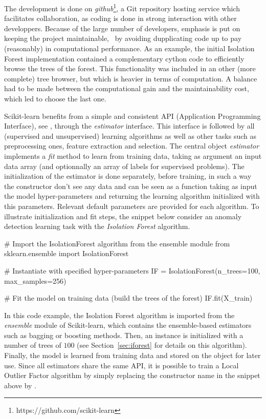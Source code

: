 The development is done on \emph{github}\footnote{https://github.com/scikit-learn}, a Git repository hosting service which facilitates collaboration, as coding is done in strong interaction with other developpers. Because of the large number of developers, emphasis is put on keeping the project maintainable, \eg~by avoiding dupplicating code up to pay (reasonably) in computational performance. As an example, the initial Isolation Forest implementation contained a complementary cython code to efficiently browse the trees of the forest. This functionality was included in an other (more complete) tree browser, but which is heavier in terms of computation. A balance had to be made between the computational gain and the maintainability cost, which led to choose the last one.


Scikit-learn benefits from a simple and consistent API (Application Programming Interface), see \cite{sklearn_api2013}, through the \emph{estimator} interface. This interface is followed by all (supervised and unsupervised) learning algorithms as well as other tasks such as preprocessing ones, feature extraction and selection. The central object \emph{estimator} implements a \emph{fit} method to learn from training data, taking as argument an input data array (and optionnally an array of labels for supervised problems). The initialization of the estimator is done separately, before training, in such a way the constructor don't see any data and can be seen as a function taking as input the model hyper-parameters and returning the learning algorithm initialized with this parameters. Relevant default parameters are provided for each algorithm. To illustrate initialization and fit steps, the snippet below consider an anomaly detection learning task with the \emph{Isolation Forest} algorithm.

\begin{pythoncode} 
# Import the IsolationForest algorithm from the ensemble module
from sklearn.ensemble import IsolationForest

# Instantiate with specified hyper-parameters
IF = IsolationForest(n_trees=100, max_samples=256)

# Fit the model on training data (build the trees of the forest)
IF.fit(X_train)
\end{pythoncode}


In this code example, the Isolation Forest algorithm is imported from the \emph{ensemble} module of Scikit-learn, which contains the ensemble-based estimators such as bagging or boosting methods. Then, an  instance  is initialized with a number of trees of $100$ (see Section~\ref{sec:iforest} for details on this algorithm). Finally, the model is learned from training data  and stored on the  object for later use. Since all estimators share the same API, it is possible to train a Local Outlier Factor algorithm by simply replacing the constructor name  in the snippet above by .

